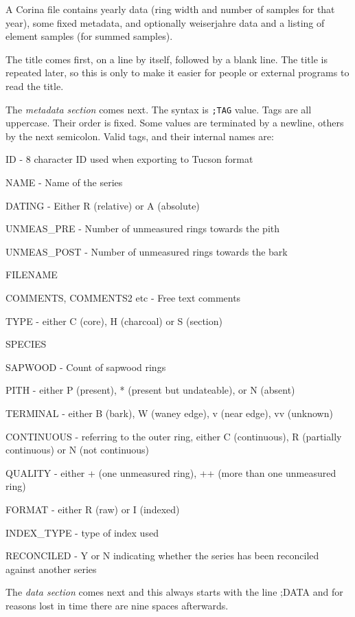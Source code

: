 A Corina file contains yearly data (ring width and number of samples for that year), some fixed metadata, and optionally weiserjahre data and a listing of element samples (for summed samples).

The title comes first, on a line by itself, followed by a blank line. The title is repeated later, so this is only to make it easier for people or external programs to read the title.

The \emph{metadata section} comes next. The syntax is \verb|;TAG| value. Tags are all uppercase. Their order is fixed. Some values are terminated by a newline, others by the next semicolon. Valid tags, and their internal names are: 

\begin{itemize*}
 \item ID - 8 character ID used when exporting to Tucson format
\item  NAME - Name of the series
\item  DATING - Either R (relative) or A (absolute)
\item  UNMEAS\_PRE - Number of unmeasured rings towards the pith
\item  UNMEAS\_POST - Number of unmeasured rings towards the bark
\item  FILENAME
\item  COMMENTS, COMMENTS2 etc - Free text comments
\item  TYPE - either C (core), H (charcoal) or S (section)
\item  SPECIES
\item  SAPWOOD - Count of sapwood rings
\item  PITH - either P (present), * (present but undateable), or N (absent)
\item  TERMINAL - either B (bark), W (waney edge), v (near edge), vv (unknown)
\item  CONTINUOUS - referring to the outer ring, either C (continuous), R (partially continuous) or N (not continuous)
\item  QUALITY - either + (one unmeasured ring), ++ (more than one unmeasured ring)
\item  FORMAT - either R (raw) or I (indexed)
\item  INDEX\_TYPE - type of index used
\item  RECONCILED - Y or N indicating whether the series has been reconciled against another series 
\end{itemize*}

The \emph{data section} comes next and this always starts with the line ;DATA and for reasons lost in time there are nine spaces afterwards.

